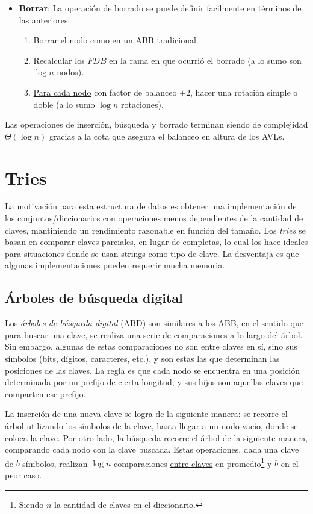 \documentclass{article}
\newcommand{\BigTheta}[1]{{\Theta(#1)}}
\begin{document}
\begin{itemize}
    \item \textbf{Borrar}: La operación de borrado se puede definir facilmente en términos de las anteriores:
          \begin{enumerate}
              \item Borrar el nodo como en un ABB tradicional.
              \item Recalcular los $FDB$ en la rama en que ocurrió el borrado (a lo sumo son $\log{n}$ nodos).
              \item \underline{Para cada nodo} con factor de balanceo $\pm 2$, hacer una rotación simple o doble (a lo sumo $\log{n}$ rotaciones).
          \end{enumerate}


\end{itemize}

Las operaciones de inserción, búsqueda y borrado terminan siendo de complejidad $\BigTheta{\log{n}}$ gracias a la cota que asegura el balanceo en altura de los AVLs.

\section{Tries}

La motivación para esta estructura de datos es obtener una implementación de los conjuntos/diccionarios con operaciones menos dependientes de la cantidad de claves, mantiniendo un rendimiento razonable en función del tamaño. Los \textit{tries} se basan en comparar claves parciales, en lugar de completas, lo cual los hace ideales para situaciones donde se usan strings como tipo de clave. La desventaja es que algunas implementaciones pueden requerir mucha memoria.

\subsection{Árboles de búsqueda digital}

Los \textit{árboles de búsqueda digital} (ABD) son similares a los ABB, en el sentido que para buscar una clave, se realiza una serie de comparaciones a lo largo del árbol. Sin embargo, algunas de estas comparaciones no son entre claves en sí, sino sus símbolos (bits, dígitos, caracteres, etc.), y son estas las que determinan las posiciones de las claves. La regla es que cada nodo se encuentra en una posición determinada por un prefijo de cierta longitud, y sus hijos son aquellas claves que comparten ese prefijo.

La inserción de una nueva clave se logra de la siguiente manera: se recorre el árbol utilizando los símbolos de la clave, hasta llegar a un nodo vacío, donde se coloca la clave. Por otro lado, la búsqueda recorre el árbol de la siguiente manera, comparando cada nodo con la clave buscada. Estas operaciones, dada una clave de $b$ símbolos, realizan $\log{n}$ comparaciones \underline{entre claves} en promedio\footnote{Siendo $n$ la cantidad de claves en el diccionario.} y $b$ en el peor caso.
\end{document}
